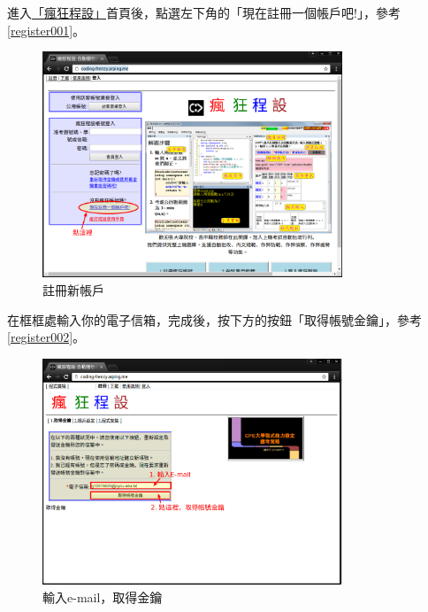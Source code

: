 進入\href{http://coding-frenzy.arping.me/}{「瘋狂程設」}首頁後，點選左下角的「現在註冊一個帳戶吧!」，參考\autoref{register001}。
\begin{figure}[H]
	\centering
	\includegraphics[width=0.8\textwidth]{fig/install_and_setting/register_001}
	\caption{註冊新帳戶}
	\label{register001}
\end{figure}

在框框處輸入你的電子信箱，完成後，按下方的按鈕「取得帳號金鑰」，參考\autoref{register002}。
\begin{figure}[H]
	\centering
	\includegraphics[width=0.8\textwidth]{fig/install_and_setting/register_002}
	\caption{輸入e-mail，取得金鑰}
	\label{register002}
\end{figure}


